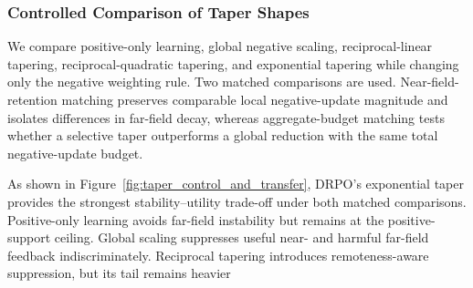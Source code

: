\subsubsection{Controlled Comparison of Taper Shapes}
\label{sec:controlled_tapers}

We compare positive-only learning, global negative scaling,
reciprocal-linear tapering, reciprocal-quadratic tapering, and
exponential tapering while changing only the negative weighting rule. Two
matched comparisons are used. Near-field-retention matching preserves
comparable local negative-update magnitude and isolates differences in far-field
decay, whereas aggregate-budget matching tests whether a selective taper
outperforms a global reduction with the same total negative-update
budget.

As shown in Figure~\ref{fig:taper_control_and_transfer}, DRPO's exponential taper
provides the strongest stability--utility trade-off under both matched
comparisons. Positive-only learning avoids far-field instability but
remains at the positive-support ceiling. Global scaling suppresses useful
near- and harmful far-field feedback indiscriminately. Reciprocal
tapering introduces remoteness-aware suppression, but its tail remains
heavier